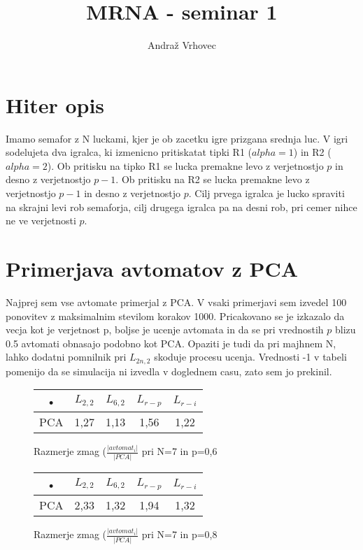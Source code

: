 \documentclass[10pt,a4paper]{report}
\author{Andraž Vrhovec}
\title{MRNA - seminar 1}
\begin{document}
\maketitle

\section{Hiter opis}

Imamo semafor z N luckami, kjer je ob zacetku igre prizgana srednja luc. V igri sodelujeta dva igralca, ki izmenicno pritiskatat tipki R1 ($alpha=1$) in R2 ($alpha=2$). Ob pritisku na tipko R1 se lucka premakne levo z verjetnostjo $p$ in desno z verjetnostjo $p-1$. Ob pritisku na R2 se lucka premakne levo z verjetnostjo $p-1$ in desno z verjetnostjo $p$. Cilj prvega igralca je lucko spraviti na skrajni levi rob semaforja, cilj drugega igralca pa na desni rob, pri cemer nihce ne ve verjetnosti $p$.

\section{Primerjava avtomatov z PCA}

Najprej sem vse avtomate primerjal z PCA. V vsaki primerjavi sem izvedel 100 ponovitev z maksimalnim stevilom korakov 1000. Pricakovano se je izkazalo da vecja kot je verjetnost p, boljse je ucenje avtomata in da se pri vrednostih $p$ blizu 0.5 avtomati obnasajo podobno kot PCA. Opaziti je tudi da pri majhnem N, lahko dodatni pomnilnik pri $L_{2n,2}$ skoduje procesu ucenja. Vrednosti -1 v tabeli pomenijo da se simulacija ni izvedla v doglednem casu, zato sem jo prekinil.


\begin{figure}[h!]
\begin{center}
\begin{tabular}{|c|c|c|c|c|}
\hline • & $L_{2,2}$ & $L_{6,2}$ & $L_{r-p}$ & $L_{r-i}$ \\ 
\hline PCA & 1,27 & 1,13 & 1,56 & 1,22 \\ 
\hline 
\end{tabular} 
\end{center}
\caption{Razmerje zmag ($\frac{|avtomat_i|}{|PCA|}$ pri N=7 in p=0,6}
\end{figure}

\begin{figure}[h!]
\begin{center}
\begin{tabular}{|c|c|c|c|c|}
\hline • & $L_{2,2}$ & $L_{6,2}$ & $L_{r-p}$ & $L_{r-i}$ \\ 
\hline PCA & 2,33 & 1,32 & 1,94 & 1,32 \\ 
\hline 
\end{tabular} 
\end{center}
\caption{Razmerje zmag ($\frac{|avtomat_i|}{|PCA|}$ pri N=7 in p=0,8}
\end{figure}
\end{document}
